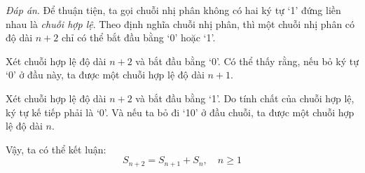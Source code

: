 \documentclass[12pt, a4paper]{article}
\begin{document}
    \textit{Đáp án}. Để thuận tiện, ta gọi chuỗi nhị phân không có hai ký tự `1' đứng liền nhau là \textit{chuỗi hợp lệ}.
    Theo định nghĩa chuỗi nhị phân, thì một chuỗi nhị phân có độ dài $n + 2$ chỉ có thể bắt đầu bằng `0' hoặc `1'.
    
    Xét chuỗi hợp lệ độ dài $n + 2$ và bắt đầu bằng `0'. 
    Có thể thấy rằng, nếu bỏ ký tự `0' ở đầu này, ta được một chuỗi hợp lệ độ dài $n + 1$.

    Xét chuỗi hợp lệ độ dài $n + 2$ và bắt đầu bằng `1'.
    Do tính chất của chuỗi hợp lệ, ký tự kế tiếp phải là `0'.
    Và nếu ta bỏ đi `10' ở đầu chuỗi, ta được một chuỗi hợp lệ độ dài $n$.

    Vậy, ta có thể kết luận:
    $$S_{n + 2} = S_{n + 1} + S_{n},\quad n \geq 1$$
\end{document}
